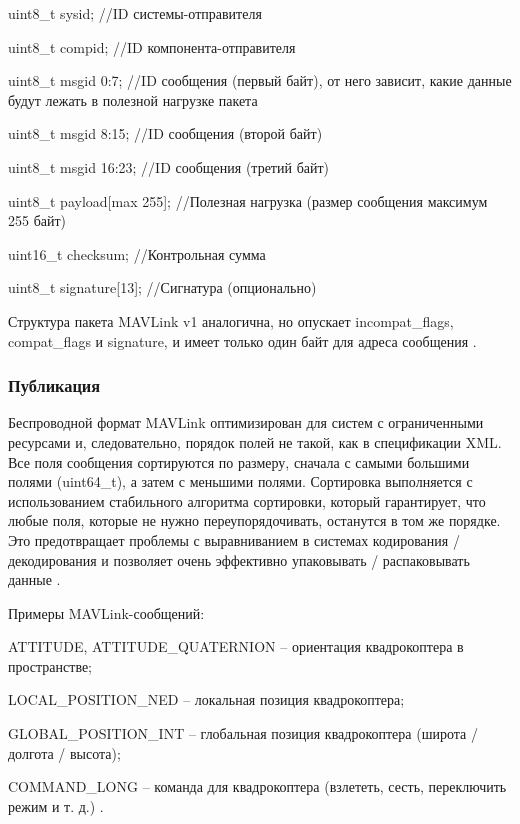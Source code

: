 uint8\_t sysid;              //ID системы-отправителя

uint8\_t compid;             //ID компонента-отправителя

uint8\_t msgid 0:7;          //ID сообщения (первый байт), от него зависит, какие данные будут лежать в полезной нагрузке пакета

uint8\_t msgid 8:15;         //ID сообщения (второй байт)

uint8\_t msgid 16:23;        //ID сообщения (третий байт)

uint8\_t payload[max 255];   //Полезная нагрузка (размер сообщения максимум 255 байт) 

uint16\_t checksum;          //Контрольная сумма

uint8\_t signature[13];      //Сигнатура (опционально)

Структура пакета MAVLink v1 аналогична, но опускает incompat\_flags, compat\_flags и signature, и имеет только один байт для адреса сообщения \cite{mavlink}.

\subsubsection{Публикация}
Беспроводной формат MAVLink оптимизирован для систем с ограниченными ресурсами и, следовательно, порядок полей не такой, как в спецификации XML. Все поля сообщения сортируются по размеру, сначала с самыми большими полями (uint64\_t), а затем с меньшими полями. Сортировка выполняется с использованием стабильного алгоритма сортировки, который гарантирует, что любые поля, которые не нужно переупорядочивать, останутся в том же порядке. Это предотвращает проблемы с выравниванием в системах кодирования / декодирования и позволяет очень эффективно упаковывать / распаковывать данные \cite{mavlink}.

Примеры MAV\-Link-сообщений:

ATTITUDE, ATTITUDE\_QUATERNION – ориентация квадрокоптера в пространстве;

LOCAL\_POSITION\_NED – локальная позиция квадрокоптера;

GLOBAL\_POSITION\_INT – глобальная позиция квадрокоптера (широта / долгота / высота);

COMMAND\_LONG – команда для квадрокоптера (взлететь, сесть, переключить режим и т. д.) \cite{clover}.

